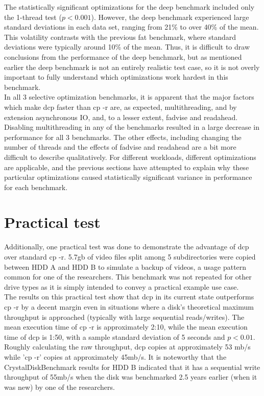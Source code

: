 \documentclass[12pt]{article}
\begin{document}
\vspace{5mm}

The statistically significant optimizations for the deep benchmark included
only the 1-thread test ($p < 0.001$). However, the deep benchmark experienced
large standard deviations in each data set, ranging from 21\% to over 40\%
of the mean. This volatility contrasts with the previous fat benchmark,
where standard deviations were typically around 10\% of the mean. Thus,
it is difficult to draw conclusions from the performance of the deep benchmark,
but as mentioned earlier the deep benchmark is not an entirely realistic test
case, so it is not overly important to fully understand which optimizations
work hardest in this benchmark. \\

In all 3 selective optimization benchmarks, it is apparent that the major
factors which make dcp faster than cp -r are, as expected, multithreading,
and by extension asynchronous IO, and, to a lesser extent, fadvise and readahead.
Disabling multithreading in any of the benchmarks resulted in a large decrease
in performance for all 3 benchmarks. The other effects, including changing
the number of threads and the effects of fadvise and readahead are a bit more
difficult to describe qualitatively. For different workloads, different optimizations
are applicable, and the previous sections have attempted to explain why these
particular optimizations caused statistically significant variance in performance
for each benchmark. \\


\section{Practical test}
Additionally, one practical test was done to demonstrate the advantage
of dcp over standard cp -r. 5.7gb of video files split among 5 subdirectories were copied between
HDD A and HDD B to simulate a backup of videos, a usage pattern common for one of the researchers.
This benchmark was not repeated for other drive types as it is simply intended to convey a practical example use
case. \\

The results on this practical test show that dcp in its current state outperforms cp -r by a decent margin even
in situations where a disk's theoretical maximum throughput is approached (typically with large sequential reads/writes).
The mean execution time of cp -r is approximately 2:10, while the mean execution time of dcp is 1:50, with a sample standard deviation of
5 seconds and $p < 0.01$. Roughly calculating the raw throughput, dcp copies at approximately 53 mb/s while 'cp -r' copies
at approximately 45mb/s. It is noteworthy that the CrystalDiskBenchmark results for HDD B indicated that it has a sequential
write throughput of 55mb/s when the disk was benchmarked 2.5 years earlier (when it was new) by one of the researchers. \\
\end{document}

